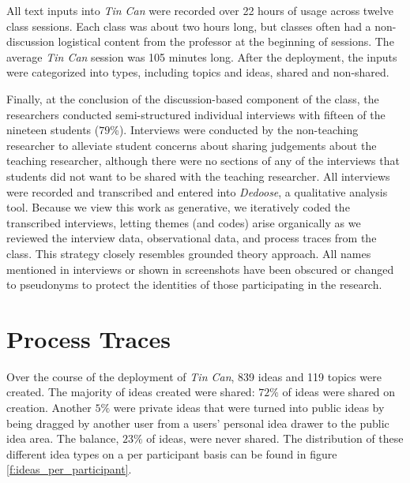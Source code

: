All text inputs into \emph{Tin Can} were recorded over 22 hours of usage across twelve class sessions.  Each class was about two hours long, but classes often had a non-discussion logistical content from the professor at the beginning of sessions. The average \emph{Tin Can} session was 105 minutes long. After the deployment, the inputs were categorized into types, including topics and ideas, shared and non-shared.

Finally, at the conclusion of the discussion-based component of the class, the researchers conducted semi-structured individual interviews with fifteen of the nineteen students ($79$\%). Interviews were conducted by the non-teaching researcher to alleviate student concerns about sharing judgements about the teaching researcher, although there were no sections of any of the interviews that students did not want to be shared with the teaching researcher. All interviews were recorded and transcribed and entered into \emph{Dedoose}, a qualitative analysis tool. Because we view this work as generative, we iteratively coded the transcribed interviews, letting themes (and codes) arise organically as we reviewed the interview data, observational data, and process traces from the class. This strategy closely resembles \citet{Glaser:1967tj} grounded theory approach. All names mentioned in interviews or shown in screenshots have been obscured or changed to pseudonyms to protect the identities of those participating in the research.



\section{Process Traces}

Over the course of the deployment of \emph{Tin Can}, 839 ideas and 119 topics were created. The  majority of ideas created were shared: $72\%$ of ideas were shared on creation. Another $5\%$ were private ideas that were turned into public ideas by being dragged by another user from a users' personal idea drawer to the public idea area. The balance, $23\%$ of ideas, were never shared. The distribution of these different idea types on a per participant basis can be found in figure \ref{f:ideas_per_participant}. 

